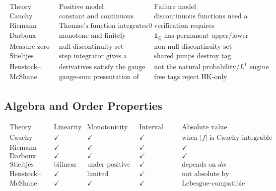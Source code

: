 \begin{exposition}
\[
\begin{aligned}
\begin{array}{c|c|c}
\text{Theory} & \text{Positive model} & \text{Failure model}\\
\hline
\text{Cauchy} &
\text{constant and continuous functions} &
\text{discontinuous functions need a better test}\\
\text{Riemann} &
\text{Thomae's function integrates to }0 &
\text{verification requires controlling all tags}\\
\text{Darboux} &
\text{monotone and finitely discontinuous functions} &
\mathbf 1_{\mathbb Q}\text{ has permanent upper/lower gap}\\
\text{Measure zero} &
\text{null discontinuity set} &
\text{non-null discontinuity set}\\
\text{Stieltjes} &
\text{step integrator gives a weighted finite sum} &
\text{shared jumps destroy tag independence}\\
\text{Henstock--Kurzweil} &
\text{derivatives satisfy the gauge FTC} &
\text{not the natural probability/}L^1\text{ engine}\\
\text{McShane} &
\text{gauge-sum presentation of Lebesgue integration} &
\text{free tags reject HK-only cancellation}
\end{array}
\end{aligned}
\]
\end{exposition}

\subsection*{Algebra and Order Properties}

\begin{exposition}
\[
\begin{aligned}
\begin{array}{c|c|c|c|c}
\text{Theory} & \text{Linearity} & \text{Monotonicity} &
\text{Interval additivity} & \text{Absolute value control}\\
\hline
\text{Cauchy} & \checkmark & \checkmark & \checkmark &
\text{when }|f|\text{ is Cauchy-integrable}\\
\text{Riemann} & \checkmark & \checkmark & \checkmark & \checkmark\\
\text{Darboux} & \checkmark & \checkmark & \checkmark & \checkmark\\
\text{Stieltjes} & \text{bilinear} & \text{under positive rulers} &
\checkmark & \text{depends on }d\alpha\\
\text{Henstock--Kurzweil} & \checkmark & \text{limited} &
\checkmark & \text{not absolute by design}\\
\text{McShane} & \checkmark & \checkmark & \checkmark &
\text{Lebesgue-compatible}
\end{array}
\end{aligned}
\]
\end{exposition}

